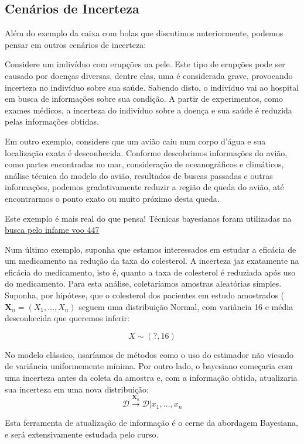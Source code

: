 \documentclass[
  portuguese,
  letterpaper,
  DIV=11,
  numbers=noendperiod]{scrreport}
\begin{document}
\subsection{Cenários de Incerteza}\label{cenuxe1rios-de-incerteza}

Além do exemplo da caixa com bolas que discutimos anteriormente, podemos
pensar em outros cenários de incerteza:

Considere um indivíduo com erupções na pele. Este tipo de erupções pode
ser causado por doenças diversas, dentre elas, uma é considerada grave,
provocando incerteza no indivíduo sobre sua saúde. Sabendo disto, o
indivíduo vai ao hospital em busca de informações sobre sua condição. A
partir de experimentos, como exames médicos, a incerteza do indivíduo
sobre a doença e sua saúde é reduzida pelas informações obtidas.

Em outro exemplo, considere que um avião caiu num corpo d'água e sua
localização exata é desconhecida. Conforme descobrimos informações do
avião, como partes encontradas no mar, consideração de oceanográficos e
climáticos, análise técnica do modelo do avião, resultados de buscas
passadas e outras informações, podemos gradativamente reduzir a região
de queda do avião, até encontrarmos o ponto exato ou muito próximo desta
queda.

Este exemplo é mais real do que pensa! Técnicas bayesianas foram
utilizadas na
\href{https://www.technologyreview.com/2014/05/27/13283/how-statisticians-found-air-france-flight-447-two-years-after-it-crashed-into-atlantic/}{busca
pelo infame voo 447}

Num último exemplo, suponha que estamos interessados em estudar a
eficácia de um medicamento na redução da taxa do colesterol. A incerteza
jaz exatamente na eficácia do medicamento, isto é, quanto a taxa de
colesterol é reduziada após uso do medicamento. Para esta análise,
coletaríamos amostras aleatórias simples. Suponha, por hipótese, que o
colesterol dos pacientes em estudo amostrados
(\(\boldsymbol{X}_n = (X_1, \dots, X_n)\) seguem uma distribuição
Normal, com variância 16 e média desconhecida que queremos inferir:

\[
X \sim (?,16)
\]

No modelo clássico, usaríamos de métodos como o uso do estimador não
viesado de variância uniformemente mínima. Por outro lado, o bayesiano
começaria com uma incerteza antes da coleta da amostra e, com a
informação obtida, atualizaria sua incerteza em uma nova distribuição:
\[
\mathcal{D} \stackrel{\boldsymbol{X}_n}{\rightarrow} \mathcal{D} \lvert x_1,
\dots, x_n
\]

Esta ferramenta de atualização de informação é o cerne da abordagem
Bayesiana, e será extensivamente estudada pelo curso.


\printbibliography
\end{document}
